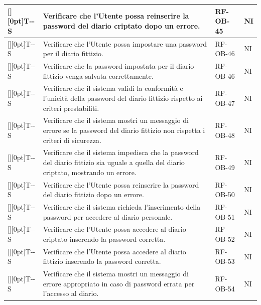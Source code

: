 \documentclass[a4paper,12pt]{article}
\newcounter{testsys}
\newcommand{\systestcode}{%
  \raisebox{0pt}[\height][0pt]{\hypertarget{T-\arabic{testsys}-S}{}}T-\arabic{testsys}-S%
}
\begin{document}
\begin{longtable}{| >{\centering\arraybackslash}p{} | >{\raggedright\arraybackslash}p{} | >{\centering\arraybackslash}p{} | >{\centering\arraybackslash}p{} |}
\stepcounter{testsys} \systestcode & Verificare che l'Utente possa reinserire la password del diario criptato dopo un errore. & RF-OB-45 & NI \\
\hline

\stepcounter{testsys} \systestcode & Verificare che l'Utente possa impostare una password per il diario fittizio. & RF-OB-46 & NI \\
\hline

\stepcounter{testsys} \systestcode & Verificare che la password impostata per il diario fittizio venga salvata correttamente. & RF-OB-46 & NI \\
\hline

\stepcounter{testsys} \systestcode & Verificare che il sistema validi la conformità e l'unicità della password del diario fittizio rispetto ai criteri prestabiliti. & RF-OB-47 & NI \\
\hline

\stepcounter{testsys} \systestcode & Verificare che il sistema mostri un messaggio di errore se la password del diario fittizio non rispetta i criteri di sicurezza. & RF-OB-48 & NI \\
\hline

\stepcounter{testsys} \systestcode & Verificare che il sistema impedisca che la password del diario fittizio sia uguale a quella del diario criptato, mostrando un errore. & RF-OB-49 & NI \\
\hline

\stepcounter{testsys} \systestcode & Verificare che l'Utente possa reinserire la password del diario fittizio dopo un errore. & RF-OB-50 & NI \\
\hline

\stepcounter{testsys} \systestcode & Verificare che il sistema richieda l'inserimento della password per accedere al diario personale. & RF-OB-51 & NI \\
\hline

\stepcounter{testsys} \systestcode & Verificare che l'Utente possa accedere al diario criptato inserendo la password corretta. & RF-OB-52 & NI \\
\hline

\stepcounter{testsys} \systestcode & Verificare che l'Utente possa accedere al diario fittizio inserendo la password corretta. & RF-OB-53 & NI \\
\hline

\stepcounter{testsys} \systestcode & Verificare che il sistema mostri un messaggio di errore appropriato in caso di password errata per l'accesso al diario. & RF-OB-54 & NI \\
\hline


\end{longtable}
\end{document}
